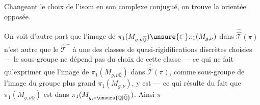 


Changeant le choix de l'isom en son complexe conjugué, on trouve la   orientée opposée.

On voit d'autre part que l'image de $\pi_1(M_{g,\nu\overline{\mathbb Q}})\unsure{\subset}\pi_1(M_{g,\nu})$ dans $\widehat{\widehat{\mathcal T}}(\pi)$ n'est autre que le $\widehat{\mathcal T}^{+}$  à une  des classes de quasi-rigidifications discrètes choisies --- le sous-groupe ne dépend pas du choix de cette classe --- ce qui ne fait qu'exprimer que l'image de $\pi_1(M_{g,\nu\overline{\mathbb Q}})$ dans $\widehat{\widehat{\mathcal T}}(\pi)$,  comme sous-groupe de l'image du groupe plus grand $\pi_1(M_{g,\nu})$, y est  --- ce qui résulte du fait que $\pi_1(M_{g,\nu\overline{\mathbb Q}})$ est  dans $\pi_1(M_{g,\nu\unsure{\mathbb Q|\overline{\mathbb Q}}})$. Ainsi $\pi$

